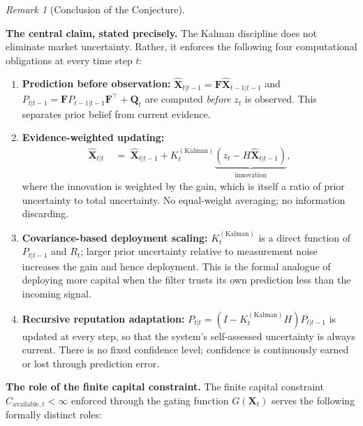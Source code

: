 \documentclass[12pt,openany]{book}
\numberwithin{equation}{chapter}
\theoremstyle{plain}
\theoremstyle{definition}
\theoremstyle{remark}
\newtheorem{remark}[theorem]{Remark}
\begin{document}
\begin{remark}[Conclusion of the Conjecture]
\label{rem:conjecture-conclusion}

\noindent\textbf{The central claim, stated precisely.}
The Kalman discipline does not eliminate market uncertainty.
Rather, it enforces the following four computational
obligations at every time step $t$:

\begin{enumerate}
  \item \textbf{Prediction before observation:}
        $\hat{\mathbf{X}}_{t|t-1} = \mathbf{F}\hat{\mathbf{X}}_{t-1|t-1}$
        and $P_{t|t-1} = \mathbf{F}P_{t-1|t-1}\mathbf{F}^\top + \mathbf{Q}_t$
        are computed \emph{before} $z_t$ is observed.
        This separates prior belief from current evidence.

  \item \textbf{Evidence-weighted updating:}
        \begin{align}
          \hat{\mathbf{X}}_{t|t}
          &\;=\; \hat{\mathbf{X}}_{t|t-1}
            + K_t^{(\mathrm{Kalman})}
            \underbrace{(z_t - H\hat{\mathbf{X}}_{t|t-1})}_{\text{innovation}},
          \label{eq:update-step-recall}
        \end{align}
        where the innovation is weighted by the gain, which
        is itself a ratio of prior uncertainty to total
        uncertainty.  No equal-weight averaging; no
        information discarding.

  \item \textbf{Covariance-based deployment scaling:}
        $K_t^{(\mathrm{Kalman})}$ is a direct function of
        $P_{t|t-1}$ and $R_t$; larger prior uncertainty
        relative to measurement noise increases the gain
        and hence deployment.  This is the formal analogue
        of deploying more capital when the filter trusts
        its own prediction less than the incoming signal.

  \item \textbf{Recursive reputation adaptation:}
        $P_{t|t} = (I - K_t^{(\mathrm{Kalman})} H) P_{t|t-1}$
        is updated at every step, so that the system's
        self-assessed uncertainty is always current.
        There is no fixed confidence level; confidence is
        continuously earned or lost through prediction error.
\end{enumerate}

\medskip
\noindent\textbf{The role of the finite capital constraint.}
The finite capital constraint $C_{\mathrm{available},t} < \infty$
enforced through the gating function $G(\mathbf{X}_t)$
serves the following formally distinct roles:


\end{remark}
\end{document}
